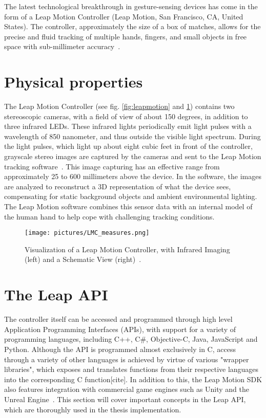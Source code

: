 
The latest technological breakthrough in gesture-sensing devices has come in the form of a Leap Motion Controller (Leap Motion, San Francisco, CA, United States). 
The controller, approximately the size of a box of matches, allows for the precise and fluid tracking of multiple hands, fingers, and small objects in free space with 
sub-millimeter accuracy~\citep{Guna2014}.

\section{Physical properties}
The Leap Motion Controller (see fig. \ref{fig:leapmotion} and \ref{fig:leapmotion2}) contains two stereoscopic cameras, with a field of view of about 150 degrees, 
in addition to three infrared LEDs. These infrared lights periodically emit light pulses with a wavelength of 850 nanometer, and thus outside the visible light spectrum. 
During the light pulses, 
which light up about eight cubic feet in front of the controller, grayscale stereo images are captured by the cameras and sent to the 
Leap Motion tracking software~\citep{LeapMotion2016}. 
This image capturing has an effective range from approximately 25 to 600 millimeters above the device.
In the software, the images are analyzed to reconstruct a 3D representation of what the device sees, 
compensating for static background objects and ambient environmental lighting. 
The Leap Motion software combines this sensor data with an internal model of the human hand to help cope with challenging tracking conditions.


\begin{figure}%
	\texttt{[image: pictures/LMC\_measures.png]}
	\caption[Visualization of a Leap Motion Controller]{Visualization of a Leap Motion Controller, with Infrared Imaging (left) and a Schematic View (right)~\citep{Weichert2013}.}
	\label{fig:leapmotion2}
\end{figure} 

\section{The Leap API}
The controller itself can be accessed and programmed through high level Application Programming Interfaces (APIs), with support for a variety of programming languages, 
including C++, C\#, Objective-C, Java, JavaScript and Python. Although the API is programmed almost exclusively in C, access through a variety of other languages 
is achieved by virtue of various "wrapper libraries", which exposes and translates functions from their respective languages into the corresponding C function[cite].
In addition to this, the Leap Motion SDK also features integration with commercial game engines such as Unity and the Unreal Engine~\citep{Guna2014}. 
This section will cover important concepts in the Leap API, which are thoroughly used in the thesis implementation.

